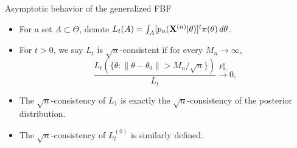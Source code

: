 \documentclass{beamer}
\theoremstyle{plain}
\theoremstyle{definition}
\theoremstyle{remark}
\begin{document}
\begin{frame}{Asymptotic behavior of the generalized FBF}
    \begin{itemize}
        \item
    For a set $A\subset \Theta$, denote $L_t (A)=\int_{A} [ {p_n(\mathbf{X}^{(n)}|\theta)} ]^{t} \pi(\theta) \, d \theta$.
        \item
    For $t>0$, we say $L_t$ is $\sqrt{n}$-consistent if for every $M_n\to \infty$,
    $$
    \frac{L_t({\{\theta:\|\theta-\theta_0\|> M_n/\sqrt{n}\}})}{L_t}\xrightarrow{P_{\theta_0}^n} 0,
    $$
\item
    The $\sqrt{n}$-consistency of $L_1$ is exactly the $\sqrt{n}$-consistency of the posterior distribution.
            \item
    The $\sqrt{n}$-consistency of $L_t^{(0)}$ is similarly defined.
\end{itemize}
\end{frame}
\end{document}
